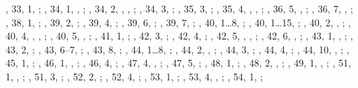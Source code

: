 \begin{autindex}
    , 33,  1, ;
    , 34,  1, , ;
    , 34,  2, , , ;
    , 34,  3, ;
    , 35,  3, ;
    , 35,  4, , , ;
    , 36,  5, , ;
    , 36,  7, , ;
    , 38,  1, ;
    , 39,  2, ;
    , 39,  4, ;
    , 39,  6, ;
    , 39,  7, ;
    , 40,  1…8, ;
    , 40,  1…15, ;
    , 40,  2, , ;
    , 40,  4, , , ;
    , 40,  5, , ;
    , 41,  1, ;
    , 42,  3, ;
    , 42,  4, ;
    , 42,  5, , , ;
    , 42,  6, , ;
    , 43,  1, , ;
    , 43,  2, ;
    , 43,  6–7, ;
    , 43,  8, ;
    , 44,  1…8, ;
    , 44,  2, , ;
    , 44,  3, ;
    , 44,  4, ;
    , 44, 10, , ;
    , 45,  1, ;
    , 46,  1, , ;
    , 46,  4, ;
    , 47,  4, , ;
    , 47,  5, ;
    , 48,  1, ;
    , 48,  2, , ;
    , 49,  1, , ;
    , 51,  1, , ;
    , 51,  3, ;
    , 52,  2, ;
    , 52,  4, ;
    , 53,  1, ;
    , 53,  4, , ;
    , 54,  1, ;


\end{autindex}
